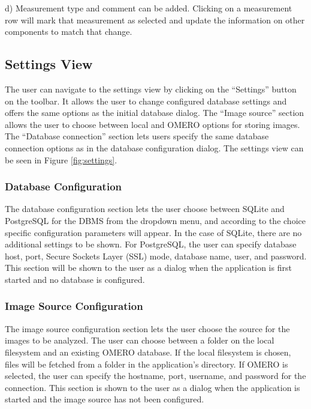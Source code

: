 d) Measurement type and comment can be added. Clicking on a measurement row will mark that measurement as selected and update the information on other components to match that change.

\subsection{Settings View}
The user can navigate to the settings view by clicking on the “Settings” button on the toolbar. It allows the user to change configured database settings and offers the same options as the initial database dialog. The “Image source” section allows the user to choose between local and OMERO options for storing images. The “Database connection” section lets users specify the same database connection options as in the database configuration dialog. The settings view can be seen in Figure \ref{fig:settings}.

\subsubsection{Database Configuration}
The database configuration section lets the user choose between SQLite and PostgreSQL for the DBMS from the dropdown menu, and according to the choice specific configuration parameters will appear. In the case of SQLite, there are no additional settings to be shown. For PostgreSQL, the user can specify database host, port, Secure Sockets Layer (SSL) mode, database name, user, and password. This section will be shown to the user as a dialog when the application is first started and no database is configured.

\subsubsection{Image Source Configuration}
The image source configuration section lets the user choose the source for the images to be analyzed. The user can choose between a folder on the local filesystem and an existing OMERO database. If the local filesystem is chosen, files will be fetched from a folder in the application’s directory. If OMERO is selected, the user can specify the hostname, port, username, and password for the connection. This section is shown to the user as a dialog when the application is started and the image source has not been configured.
